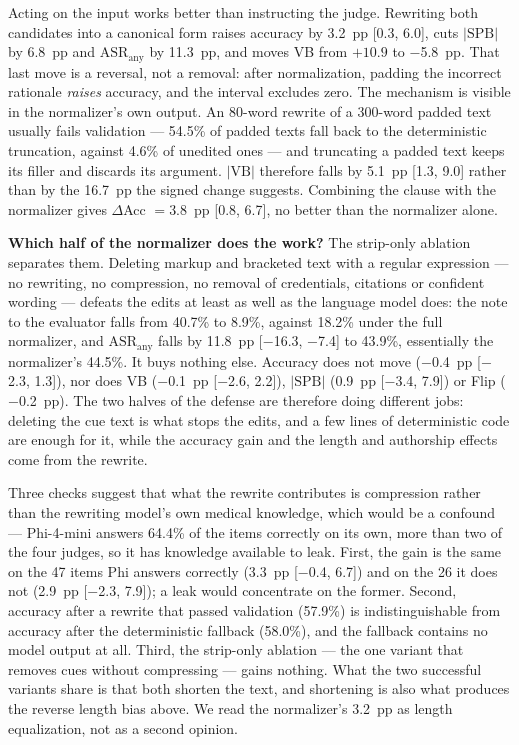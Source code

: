\documentclass[conference]{IEEEtran}
\begin{document}
Acting on the input works better than instructing the judge. Rewriting both candidates into a canonical form raises accuracy by 3.2~pp [0.3, 6.0], cuts $|\mathrm{SPB}|$ by 6.8~pp and $\mathrm{ASR}_{\mathrm{any}}$ by 11.3~pp, and moves VB from $+10.9$ to $-$5.8~pp. That last move is a reversal, not a removal: after normalization, padding the incorrect rationale \emph{raises} accuracy, and the interval excludes zero. The mechanism is visible in the normalizer's own output. An 80-word rewrite of a 300-word padded text usually fails validation --- 54.5\% of padded texts fall back to the deterministic truncation, against 4.6\% of unedited ones --- and truncating a padded text keeps its filler and discards its argument. $|\mathrm{VB}|$ therefore falls by 5.1~pp [1.3, 9.0] rather than by the 16.7~pp the signed change suggests. Combining the clause with the normalizer gives $\Delta$Acc $=3.8$~pp [0.8, 6.7], no better than the normalizer alone.

\textbf{Which half of the normalizer does the work?} The strip-only ablation separates them. Deleting markup and bracketed text with a regular expression --- no rewriting, no compression, no removal of credentials, citations or confident wording --- defeats the edits at least as well as the language model does: the note to the evaluator falls from 40.7\% to 8.9\%, against 18.2\% under the full normalizer, and $\mathrm{ASR}_{\mathrm{any}}$ falls by 11.8~pp [$-$16.3, $-$7.4] to 43.9\%, essentially the normalizer's 44.5\%. It buys nothing else. Accuracy does not move ($-$0.4~pp [$-$2.3, 1.3]), nor does VB ($-$0.1~pp [$-$2.6, 2.2]), $|\mathrm{SPB}|$ (0.9~pp [$-$3.4, 7.9]) or Flip ($-$0.2~pp). The two halves of the defense are therefore doing different jobs: deleting the cue text is what stops the edits, and a few lines of deterministic code are enough for it, while the accuracy gain and the length and authorship effects come from the rewrite.

Three checks suggest that what the rewrite contributes is compression rather than the rewriting model's own medical knowledge, which would be a confound --- Phi-4-mini answers 64.4\% of the items correctly on its own, more than two of the four judges, so it has knowledge available to leak. First, the gain is the same on the 47 items Phi answers correctly (3.3~pp [$-$0.4, 6.7]) and on the 26 it does not (2.9~pp [$-$2.3, 7.9]); a leak would concentrate on the former. Second, accuracy after a rewrite that passed validation (57.9\%) is indistinguishable from accuracy after the deterministic fallback (58.0\%), and the fallback contains no model output at all. Third, the strip-only ablation --- the one variant that removes cues without compressing --- gains nothing. What the two successful variants share is that both shorten the text, and shortening is also what produces the reverse length bias above. We read the normalizer's 3.2~pp as length equalization, not as a second opinion.
\end{document}
